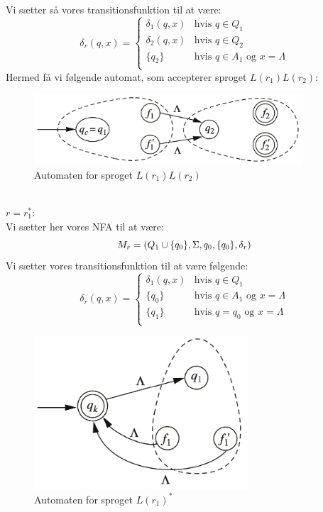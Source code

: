 \documentclass[a4, danish]{article}
\begin{document}
    Vi sætter så vores transitionsfunktion til at være:
    \begin{equation*}
		  \delta_r(q,x) =
  		\begin{cases}
  			\mbox{$\delta_1(q,x)$} & \mbox{hvis $q\in Q_1$} \\
  			\mbox{$\delta_2(q,x)$} & \mbox{hvis $q\in Q_2$} \\
        \mbox{$\{q_2\}$} & \mbox{hvis $q\in A_1$ og $x=\Lambda$} \\
  		\end{cases}
		\end{equation*} 
    Hermed få vi følgende automat, som accepterer sproget $L(r_1)L(r_2)$:
    \begin{figure}[ht!]
  	  \centering
  	  \includegraphics[width=100mm]{img/Kleene14.png}
  	  \caption{Automaten for sproget $L(r_1)L(r_2)$	\label{KleeneInd2}}
    \end{figure}
    \\
    $r=r_1^*$:\\
    Vi sætter her vores NFA til at være:
    \begin{equation*}
      M_r=(Q_1\cup \{q_0\},\Sigma,q_0,\{q_0\},\delta_r)\\
    \end{equation*}
    Vi sætter vores transitionsfunktion til at være følgende:
        \begin{equation*}
		  \delta_r(q,x) =
  		\begin{cases}
  			\mbox{$\delta_1(q,x)$} & \mbox{hvis $q\in Q_1$} \\
        \mbox{$\{q_0\}$} & \mbox{hvis $q\in A_1$ og $x=\Lambda$} \\
        \mbox{$\{q_1\}$} & \mbox{hvis $q=q_0$ og $x=\Lambda$} \\
  		\end{cases}
		\end{equation*} 
    \begin{figure}[ht!]
  	  \centering
  	  \includegraphics[width=80mm]{img/Kleene15.png}
  	  \caption{Automaten for sproget $L(r_1)^*$	\label{KleeneInd3}}
    \end{figure}   
\end{document}
